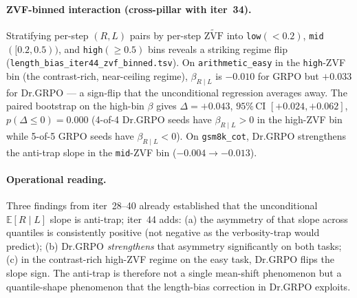 \documentclass{article}
\newcommand{\E}{\mathbb{E}}
\newcommand{\zvf}{\ensuremath{\widetilde{\mathrm{ZVF}}}}
\begin{document}
\paragraph{ZVF-binned interaction (cross-pillar with iter~34).}
Stratifying per-step $(R, L)$ pairs by per-step \zvf{} into
\texttt{low}$(<\!0.2)$, \texttt{mid}$([0.2, 0.5))$, and
\texttt{high}$(\ge\!0.5)$ bins reveals a striking regime flip
(\texttt{length\_bias\_iter44\_zvf\_binned.tsv}). On \texttt{arithmetic\_easy}
in the \texttt{high}-ZVF bin (the contrast-rich, near-ceiling regime),
$\beta_{R \mid L}$ is $-0.010$ for GRPO but $+0.033$ for Dr.GRPO --- a
sign-flip that the unconditional regression averages away. The paired bootstrap
on the high-bin $\beta$ gives $\Delta = +0.043$, $95\%$\,CI
$[+0.024, +0.062]$, $p(\Delta \le 0) = 0.000$ (4-of-4 Dr.GRPO seeds have
$\beta_{R \mid L} > 0$ in the high-ZVF bin while 5-of-5 GRPO seeds have
$\beta_{R \mid L} < 0$). On \texttt{gsm8k\_cot}, Dr.GRPO strengthens the
anti-trap slope in the \texttt{mid}-ZVF bin ($-0.004 \to -0.013$).

\paragraph{Operational reading.}
Three findings from iter~28--40 already established that the unconditional
$\E[R \mid L]$ slope is anti-trap; iter~44 adds: (a) the asymmetry of that
slope across quantiles is consistently positive (not negative as the
verbosity-trap would predict); (b) Dr.GRPO \emph{strengthens} that
asymmetry significantly on both tasks; (c) in the contrast-rich
high-ZVF regime on the easy task, Dr.GRPO flips the slope sign. The
anti-trap is therefore not a single mean-shift phenomenon but a
quantile-shape phenomenon that the length-bias correction in Dr.GRPO
exploits.
\end{document}
